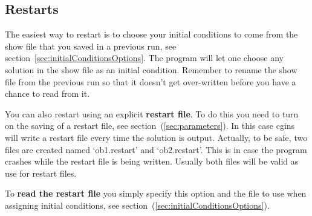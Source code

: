\subsection{Restarts}

 The easiest way to restart is to choose your initial conditions to come from
the show file that you saved in a previous run, see section~\ref{sec:initialConditionsOptions}.
The program will let one choose any solution in the show file as an initial
condition.
Remember to rename the show file from the previous run 
so that it doesn't get over-written before
you have a chance to read from it.

You can also restart using an explicit {\bf restart file}. 
To do this you need to turn on the saving of a restart file, see section~(\ref{sec:parameters}). 
In this case
cgins will write a restart file every time the solution is output. 
Actually, to be safe, two files 
are created named `ob1.restart' and `ob2.restart'. This is in case the
program crashes while the restart file is being written.
Usually both files will be valid as use for restart files.

To {\bf read the restart file} you simply specify this option and the file
to use when assigning initial conditions, see section~(\ref{sec:initialConditionsOptions}).
